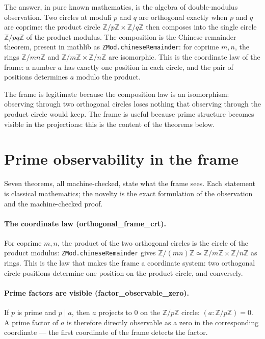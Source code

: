 \documentclass[sigplan,10pt,anonymous,review]{acmart}
\begin{document}
The answer, in pure known mathematics, is the algebra of double-modulus
observation. Two circles at moduli $p$ and $q$ are orthogonal exactly
when $p$ and $q$ are coprime: the product circle
$\mathbb{Z}/p\mathbb{Z} \times \mathbb{Z}/q\mathbb{Z}$ then composes
into the single circle $\mathbb{Z}/pq\mathbb{Z}$ of the product modulus.
The composition is the Chinese remainder theorem, present in mathlib as
\texttt{ZMod.chineseRemainder}: for coprime $m, n$, the rings
$\mathbb{Z}/mn\mathbb{Z}$ and $\mathbb{Z}/m\mathbb{Z} \times
\mathbb{Z}/n\mathbb{Z}$ are isomorphic. This is the coordinate law of the
frame: a number $a$ has exactly one position in each circle, and the pair
of positions determines $a$ modulo the product.

The frame is legitimate because the composition law is an isomorphism:
observing through two orthogonal circles loses nothing that observing
through the product circle would keep. The frame is useful because prime
structure becomes visible in the projections: this is the content of the
theorems below.

\section{Prime observability in the frame}

Seven theorems, all machine-checked, state what the frame sees. Each
statement is classical mathematics; the novelty is the exact formulation
of the observation and the machine-checked proof.

\paragraph{The coordinate law (orthogonal\_frame\_crt).} For coprime
$m, n$, the product of the two orthogonal circles is the circle of the
product modulus: \texttt{ZMod.chineseRemainder} gives
$\mathbb{Z}/(mn)\mathbb{Z} \simeq \mathbb{Z}/m\mathbb{Z} \times
\mathbb{Z}/n\mathbb{Z}$ as rings. This is the law that makes the frame a
coordinate system: two orthogonal circle positions determine one position
on the product circle, and conversely.

\paragraph{Prime factors are visible (factor\_observable\_zero).} If $p$
is prime and $p \mid a$, then $a$ projects to $0$ on the
$\mathbb{Z}/p\mathbb{Z}$ circle: $(a : \mathbb{Z}/p\mathbb{Z}) = 0$. A
prime factor of $a$ is therefore directly observable as a zero in the
corresponding coordinate --- the first coordinate of the frame detects
the factor.
\end{document}
